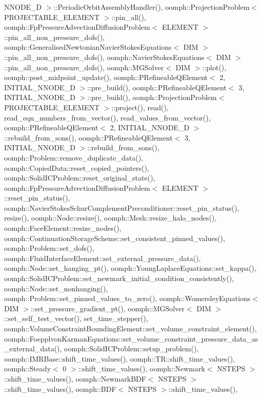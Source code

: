 N\+N\+O\+D\+E\+\_\+D $>$\+::\+Periodic\+Orbit\+Assembly\+Handler(), oomph\+::\+Projection\+Problem$<$ P\+R\+O\+J\+E\+C\+T\+A\+B\+L\+E\+\_\+\+E\+L\+E\+M\+E\+N\+T $>$\+::pin\+\_\+all(), oomph\+::\+Fp\+Pressure\+Advection\+Diffusion\+Problem$<$ E\+L\+E\+M\+E\+N\+T $>$\+::pin\+\_\+all\+\_\+non\+\_\+pressure\+\_\+dofs(), oomph\+::\+Generalised\+Newtonian\+Navier\+Stokes\+Equations$<$ D\+I\+M $>$\+::pin\+\_\+all\+\_\+non\+\_\+pressure\+\_\+dofs(), oomph\+::\+Navier\+Stokes\+Equations$<$ D\+I\+M $>$\+::pin\+\_\+all\+\_\+non\+\_\+pressure\+\_\+dofs(), oomph\+::\+M\+G\+Solver$<$ D\+I\+M $>$\+::plot(), oomph\+::post\+\_\+midpoint\+\_\+update(), oomph\+::\+P\+Refineable\+Q\+Element$<$ 2, I\+N\+I\+T\+I\+A\+L\+\_\+\+N\+N\+O\+D\+E\+\_\+D $>$\+::pre\+\_\+build(), oomph\+::\+P\+Refineable\+Q\+Element$<$ 3, I\+N\+I\+T\+I\+A\+L\+\_\+\+N\+N\+O\+D\+E\+\_\+D $>$\+::pre\+\_\+build(), oomph\+::\+Projection\+Problem$<$ P\+R\+O\+J\+E\+C\+T\+A\+B\+L\+E\+\_\+\+E\+L\+E\+M\+E\+N\+T $>$\+::project(), read(), read\+\_\+eqn\+\_\+numbers\+\_\+from\+\_\+vector(), read\+\_\+values\+\_\+from\+\_\+vector(), oomph\+::\+P\+Refineable\+Q\+Element$<$ 2, I\+N\+I\+T\+I\+A\+L\+\_\+\+N\+N\+O\+D\+E\+\_\+D $>$\+::rebuild\+\_\+from\+\_\+sons(), oomph\+::\+P\+Refineable\+Q\+Element$<$ 3, I\+N\+I\+T\+I\+A\+L\+\_\+\+N\+N\+O\+D\+E\+\_\+D $>$\+::rebuild\+\_\+from\+\_\+sons(), oomph\+::\+Problem\+::remove\+\_\+duplicate\+\_\+data(), oomph\+::\+Copied\+Data\+::reset\+\_\+copied\+\_\+pointers(), oomph\+::\+Solid\+I\+C\+Problem\+::reset\+\_\+original\+\_\+state(), oomph\+::\+Fp\+Pressure\+Advection\+Diffusion\+Problem$<$ E\+L\+E\+M\+E\+N\+T $>$\+::reset\+\_\+pin\+\_\+status(), oomph\+::\+Navier\+Stokes\+Schur\+Complement\+Preconditioner\+::reset\+\_\+pin\+\_\+status(), resize(), oomph\+::\+Node\+::resize(), oomph\+::\+Mesh\+::resize\+\_\+halo\+\_\+nodes(), oomph\+::\+Face\+Element\+::resize\+\_\+nodes(), oomph\+::\+Continuation\+Storage\+Scheme\+::set\+\_\+consistent\+\_\+pinned\+\_\+values(), oomph\+::\+Problem\+::set\+\_\+dofs(), oomph\+::\+Fluid\+Interface\+Element\+::set\+\_\+external\+\_\+pressure\+\_\+data(), oomph\+::\+Node\+::set\+\_\+hanging\+\_\+pt(), oomph\+::\+Young\+Laplace\+Equations\+::set\+\_\+kappa(), oomph\+::\+Solid\+I\+C\+Problem\+::set\+\_\+newmark\+\_\+initial\+\_\+condition\+\_\+consistently(), oomph\+::\+Node\+::set\+\_\+nonhanging(), oomph\+::\+Problem\+::set\+\_\+pinned\+\_\+values\+\_\+to\+\_\+zero(), oomph\+::\+Womersley\+Equations$<$ D\+I\+M $>$\+::set\+\_\+pressure\+\_\+gradient\+\_\+pt(), oomph\+::\+M\+G\+Solver$<$ D\+I\+M $>$\+::set\+\_\+self\+\_\+test\+\_\+vector(), set\+\_\+time\+\_\+stepper(), oomph\+::\+Volume\+Constraint\+Bounding\+Element\+::set\+\_\+volume\+\_\+constraint\+\_\+element(), oomph\+::\+Foepplvon\+Karman\+Equations\+::set\+\_\+volume\+\_\+constraint\+\_\+pressure\+\_\+data\+\_\+as\+\_\+external\+\_\+data(), oomph\+::\+Solid\+I\+C\+Problem\+::setup\+\_\+problem(), oomph\+::\+I\+M\+R\+Base\+::shift\+\_\+time\+\_\+values(), oomph\+::\+T\+R\+::shift\+\_\+time\+\_\+values(), oomph\+::\+Steady$<$ 0 $>$\+::shift\+\_\+time\+\_\+values(), oomph\+::\+Newmark$<$ N\+S\+T\+E\+P\+S $>$\+::shift\+\_\+time\+\_\+values(), oomph\+::\+Newmark\+B\+D\+F$<$ N\+S\+T\+E\+P\+S $>$\+::shift\+\_\+time\+\_\+values(), oomph\+::\+B\+D\+F$<$ N\+S\+T\+E\+P\+S $>$\+::shift\+\_\+time\+\_\+values(), 